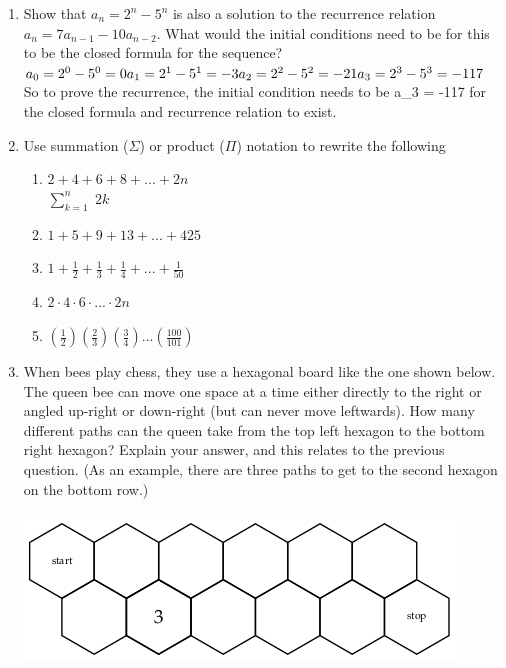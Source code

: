 \documentclass[11pt,a4paper]{article}
\newcommand\setItemNumber[1]{\setcounter{enumi}{\numexpr#1-1\relax}}
\begin{document}
\begin{enumerate}
            \setItemNumber{10}
        \item Show that $a_n = 2^n - 5^n$ is also a solution to the recurrence relation $a_n = {7a_{n - 1}} - {10a_{n - 2}}$. What would the initial conditions need to be for this to be the closed formula for the sequence?\\
            $a_0 = 2^0 - 5^0 = 0\\a_1 = 2^1 - 5^1 = -3\\a_2 = 2^2 - 5^2 = -21\\a_3 = 2^3 - 5^3 = -117$\\
            So to prove the recurrence, the initial condition needs to be a_3 = -117 for the closed formula and recurrence relation to exist.


            \setItemNumber{13}
        \item Use summation ($\Sigma$) or product ($\Pi$) notation to rewrite the following
            \begin{enumerate}

                \item $2 + 4 + 6 + 8 + ... + 2n$\\
                    $\sum_{k=1}^{n}\;2k$
                \item $1 + 5 + 9 + 13 + ... + 425$
                \item $1 + \frac{1}{2} + \frac{1}{3} + \frac{1}{4} + ... + \frac{1}{50}$
                \item $2\cdot 4\cdot 6\cdot ... \cdot2n$
                \item $(\frac{1}{2})(\frac{2}{3})(\frac{3}{4})...(\frac{100}{101})$
            \end{enumerate}

            \setItemNumber{18}
            \item When bees play chess, they use a hexagonal board like the one shown below. The queen bee can move one space at a time either directly to the right or angled up-right or down-right (but can never move leftwards). How many different paths can the queen take from the top left hexagon to the bottom right hexagon? Explain your answer, and this relates to the previous question. (As an example, there are three paths to get to the second hexagon on the bottom row.)

            \begin{center}
            \includegraphics[width=.5\textwidth]{hw6_graphic1}
            \end{center}
	
        \end{enumerate}
\end{document}
